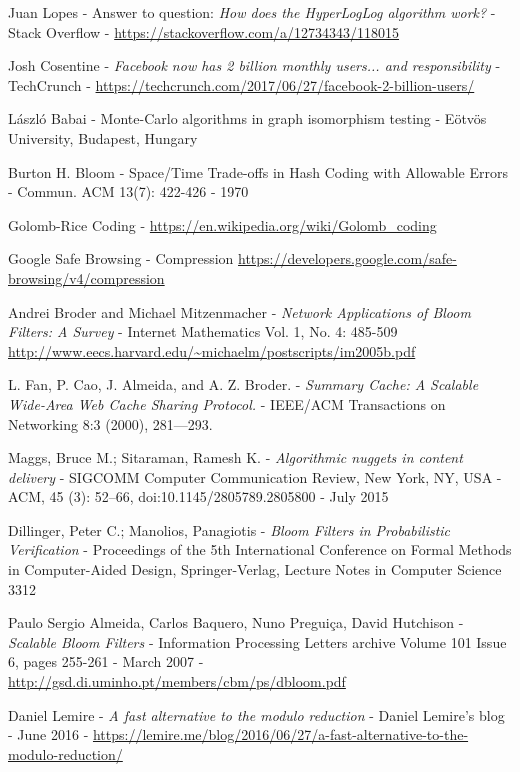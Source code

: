 \begin{thebibliography}{99}
	Juan Lopes -
	Answer to question: \emph{How does the HyperLogLog algorithm work?} -
	Stack Overflow -
	\url{https://stackoverflow.com/a/12734343/118015}

	Josh Cosentine -
	\emph{Facebook now has 2 billion monthly users... and responsibility} -
	TechCrunch -
	\url{https://techcrunch.com/2017/06/27/facebook-2-billion-users/}

	László Babai -
 	Monte-Carlo algorithms in graph isomorphism testing -
 	Eötvös University, Budapest, Hungary

	Burton H. Bloom -
	Space/Time Trade-offs in Hash Coding with Allowable Errors -
	Commun. ACM 13(7): 422-426 -
	1970

	Golomb-Rice Coding -
	\url{https://en.wikipedia.org/wiki/Golomb_coding}

	Google Safe Browsing - Compression
	\url{https://developers.google.com/safe-browsing/v4/compression}

	Andrei Broder and Michael Mitzenmacher -
	\emph{Network Applications of Bloom Filters: A Survey} -
	Internet Mathematics Vol. 1, No. 4: 485-509
	\url{http://www.eecs.harvard.edu/~michaelm/postscripts/im2005b.pdf}

	L. Fan, P. Cao, J. Almeida, and A. Z. Broder. -
	\emph{Summary Cache: A Scalable Wide-Area Web Cache Sharing Protocol.} -
	IEEE/ACM Transactions on Networking 8:3 (2000), 281—293.

	Maggs, Bruce M.; Sitaraman, Ramesh K. -
	\emph{Algorithmic nuggets in content delivery} -
	SIGCOMM Computer Communication Review, New York, NY, USA -
	ACM, 45 (3): 52–66, doi:10.1145/2805789.2805800 -
	July 2015

	Dillinger, Peter C.; Manolios, Panagiotis - 
	\emph{Bloom Filters in Probabilistic Verification} -
	Proceedings of the 5th International Conference on Formal Methods in Computer-Aided Design, Springer-Verlag, Lecture Notes in Computer Science 3312

	Paulo Sergio Almeida, Carlos Baquero, Nuno Preguiça, David Hutchison -
	\emph{Scalable Bloom Filters} -
	Information Processing Letters archive Volume 101 Issue 6, pages 255-261 -
	March 2007 -
	\url{http://gsd.di.uminho.pt/members/cbm/ps/dbloom.pdf}

	Daniel Lemire -
	\emph{A fast alternative to the modulo reduction} -
	Daniel Lemire's blog -
	June 2016 -
	\url{https://lemire.me/blog/2016/06/27/a-fast-alternative-to-the-modulo-reduction/}

\end{thebibliography}
